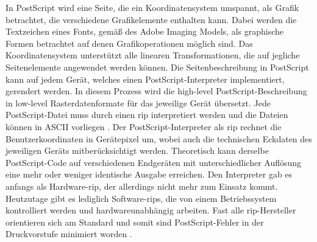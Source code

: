 In PostScript wird eine Seite, die ein Koordinatensystem umspannt, als Grafik betrachtet, die verschiedene Grafikelemente enthalten kann. Dabei werden die Textzeichen eines Fonts, gemäß des Adobe Imaging Models, als graphische Formen betrachtet auf denen Grafikoperationen möglich sind. Das Koordinatensystem unterstützt alle linearen Transformationen, die auf jegliche Seitenelemente angewendet werden können. Die Seitenbeschreibung in PostScript kann auf jedem Gerät, welches einen PostScript-Interpreter implementiert, gerendert werden. In diesem Prozess wird die high-level PostScript-Beschreibung in low-level Rasterdatenformate für das jeweilige Gerät übersetzt. Jede PostScript-Datei muss durch einen \gls{rip} interpretiert werden und die Dateien können in ASCII vorliegen \cite{adobe-postscript}. Der PostScript-Interpreter als \gls{rip} rechnet die Benutzerkoordinaten in Gerätepixel um, wobei auch die technischen Eckdaten des jeweiligen Geräts mitberücksichtigt werden. Theoretisch kann derselbe PostScript-Code auf verschiedenen Endgeräten mit unterschiedlicher Auflösung eine mehr oder weniger identische Ausgabe erreichen. Den Interpreter gab es anfangs als Hardware-\gls{rip}, der allerdings nicht mehr zum Einsatz kommt. Heutzutage gibt es lediglich Software-\gls{rip}s, die von einem Betriebssystem kontrolliert werden und hardwareunabhängig arbeiten. Fast alle \gls{rip}-Hersteller orientieren sich am Standard und somit sind PostScript-Fehler in der Druckvorstufe minimiert worden \cite{schneeberger}.

